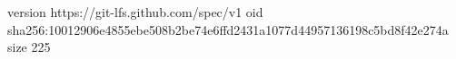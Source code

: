 version https://git-lfs.github.com/spec/v1
oid sha256:10012906e4855ebe508b2be74e6ffd2431a1077d44957136198c5bd8f42e274a
size 225
